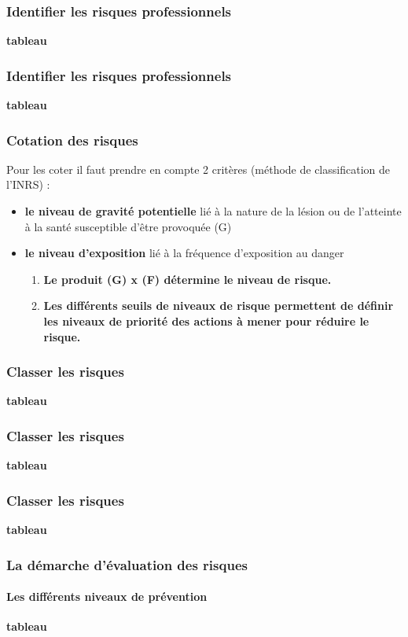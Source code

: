 \documentclass{beamer}
\begin{document}
\begin{frame}
\frametitle{Identifier les risques professionnels}
\textbf{tableau}
\end{frame}

\begin{frame}
\frametitle{Identifier les risques professionnels}
\textbf{tableau}
\end{frame}

\begin{frame}
\frametitle{Cotation des risques}
Pour les coter il faut prendre en compte 2 critères (méthode de classification de l’INRS) :
\begin{itemize}
\item \textbf{le niveau de gravité potentielle} lié à la nature de la lésion ou de l’atteinte à la santé susceptible d’être provoquée (G)
\item \textbf{le niveau d’exposition} lié à la fréquence d’exposition au danger
\begin{enumerate}
\item \textbf{Le produit (G) x (F) détermine le niveau de risque.}
\item \textbf{Les différents seuils de niveaux de risque permettent de définir les niveaux de priorité des actions à mener pour réduire le risque.}
\end{enumerate}
\end{itemize}
\end{frame}

\begin{frame}
\frametitle{Classer les risques}
\textbf{tableau}
\end{frame}

\begin{frame}
\frametitle{Classer les risques}
\textbf{tableau}
\end{frame}

\begin{frame}
\frametitle{Classer les risques}
\textbf{tableau}
\end{frame}

\begin{frame}
\frametitle{La démarche d’évaluation des risques}
\framesubtitle{Les différents niveaux de prévention}
\textbf{tableau}
\end{frame}
\end{document}
